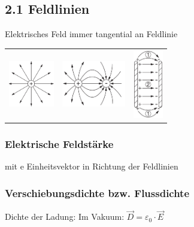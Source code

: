 \subsection{2.1 Feldlinien}
    Elektrisches Feld immer tangential an Feldlinie
    \begin{tabular}{c c c}
        \includegraphics[height = 20mm]{src/images/punktladung.png} & \includegraphics[height = 20mm]{src/images/zwei_punktladung.png} & \includegraphics[height = 30mm]{src/images/kondensator.png}
    \end{tabular}

    \subsubsection*{Elektrische Feldstärke}
         mit e Einheitsvektor in Richtung der Feldlinien

    \subsubsection*{Verschiebungsdichte bzw. Flussdichte}
        Dichte der Ladung:
        Im Vakuum: $\overrightarrow{D} = \varepsilon_0 \cdot \overrightarrow{E}$\\